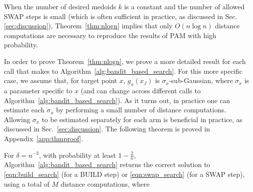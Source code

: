 When the number of desired medoids $k$ is a constant and the number of allowed SWAP steps is small (which is often sufficient in practice, as discussed in Sec. \ref{sec:discussion}), Theorem~\ref{thm:nlogn} implies that only $O(n \log n)$ distance computations are necessary to reproduce the results of PAM with high probability.

In order to prove Theorem~\ref{thm:nlogn}, we prove a more detailed result for each call that \algname makes to Algorithm~\ref{alg:bandit_based_search}.
For this more specific case, we assume that, for target point $x$, $g_x(x_J)$ is $\sigma_x$-sub-Gaussian, where $\sigma_x$ is a parameter specific to $x$ (and can change across different calls to Algorithm~\ref{alg:bandit_based_search}).
As it turns out, in practice one can estimate each $\sigma_x$ by performing a small number of distance computations.
Allowing $\sigma_x$ to be estimated separately for each arm is beneficial in practice, as discussed in Sec.~\ref{sec:discussion}.
The following theorem is proved in Appendix~\ref{app:thmproof}.






\begin{theorem} \label{thm:specific}
For $\delta = n^{-3}$, with probability at least $1-\tfrac{2}{n}$, Algorithm~\ref{alg:bandit_based_search}
returns the correct solution to \eqref{eqn:build_search} (for a BUILD step) or \eqref{eqn:swap_search} (for a SWAP step),
using a total of $M$ distance computations, where
\end{theorem}

